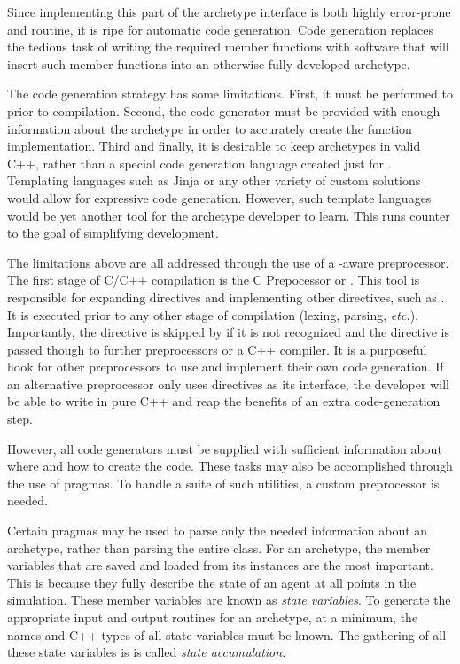 Since implementing this part of the archetype interface is both highly 
error-prone and 
routine, it is ripe for automatic code generation. Code generation replaces the 
tedious task of writing the required member functions with software that will 
insert such member functions into an otherwise fully developed archetype. 

The code generation strategy has some limitations. 
First, it must be 
performed to prior to compilation. Second, the
code generator must be provided with enough information about the archetype in 
order to accurately create the function implementation. Third and finally, it 
is desirable to keep archetypes in valid C++, rather than a special 
code generation language created just for \cyclus.
Templating languages 
such as Jinja \cite{ronacher2011jinja2} or any other variety of custom 
solutions would allow for 
expressive code generation. However, such template languages would be yet another 
tool for the archetype developer to learn. This runs counter to the goal of 
simplifying development.

The limitations above are all addressed through the use of a 
\cyclus-aware preprocessor. The first stage of C/C++ compilation is the 
C Prepocessor or  \cite{stallman1987c}. This tool is responsible for expanding 
 directives and implementing other \code{#} directives, such as 
. It is executed
prior to any other stage of compilation (lexing, parsing, \emph{etc.}).
Importantly, the  directive is skipped by  if it is not 
recognized and the directive is passed though to further preprocessors or a C++ 
compiler. It is a
purposeful hook for other preprocessors to use and implement their own code generation.
If an alternative preprocessor only uses  directives as its interface, 
the developer will be able to write in pure C++ and reap the benefits
of an extra code-generation step. 

However, all code generators must be supplied with sufficient information about
where and how to create the code. These tasks may also be accomplished through 
the use of pragmas. To handle a suite of such utilities, a custom preprocessor
is needed.

Certain pragmas may be used to parse only the needed information 
about an archetype, rather than parsing the entire class. For an archetype, the 
member variables that are saved and loaded from its instances are the most important.
This is because they fully describe the state of an agent 
at all points in the simulation. These member variables are known as \emph{state variables}. 
To generate the appropriate input and output routines for an archetype, at a minimum, the names and C++ types 
of all state variables must be known. The gathering of all these state variables is is 
called \emph{state accumulation}. 

